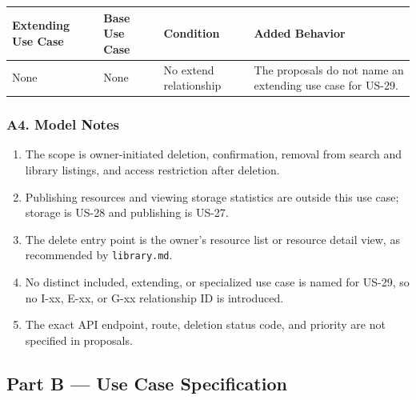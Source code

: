 \documentclass[12pt]{article}
\renewcommand{\baselinestretch}{1.5}
\begin{document}
\begingroup
\small
\renewcommand{\baselinestretch}{1.0}\selectfont
\renewcommand{\arraystretch}{1.15}
\setlength{\tabcolsep}{6pt}
\begin{longtable}{|>{\raggedright\arraybackslash}p{}|>{\raggedright\arraybackslash}p{}|>{\raggedright\arraybackslash}p{}|>{\raggedright\arraybackslash}p{}|}
\hline
\textbf{Extending Use Case} & \textbf{Base Use Case} & \textbf{Condition} & \textbf{Added Behavior} \\ \hline
\endhead
None & None & No extend relationship & The proposals do not name an extending use case for US-29. \\ \hline
\end{longtable}
\endgroup
\par\medskip

\hypertarget{sec:a4-model-notes}{}
\subsubsection*{A4. Model Notes}
\par\medskip

\begin{enumerate}
\item The scope is owner-initiated deletion, confirmation, removal from search and library listings, and access restriction after deletion.
\item Publishing resources and viewing storage statistics are outside this use case; storage is US-28 and publishing is US-27.
\item The delete entry point is the owner's resource list or resource detail view, as recommended by \texttt{library.md}.
\item No distinct included, extending, or specialized use case is named for US-29, so no I-xx, E-xx, or G-xx relationship ID is introduced.
\item The exact API endpoint, route, deletion status code, and priority are not specified in proposals.
\end{enumerate}
\par\medskip

\hypertarget{sec:part-b-use-case-specification}{}
\subsection*{Part B --- Use Case Specification}
\par\medskip
\end{document}
